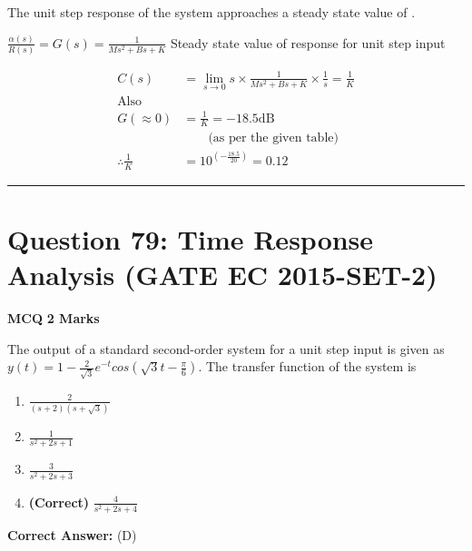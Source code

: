 \documentclass[11pt,a4paper]{article}
\begin{document}
The unit step response of the system approaches a steady state value of \underline{\hspace{1.5cm}} .


\begin{tcolorbox}[solbox, title=Detailed Solution -- Question 78]
$\frac{\alpha(s)}{R(s)}=G(s)=\frac{1}{M s^{2}+B s+K}$
 Steady state value of response for unit step input

\[
\begin{aligned} C(s)&=\lim _{s \rightarrow 0} s \times \frac{1}{M s^{2}+B s+K} \times \frac{1}{s}=\frac{1}{K} \\ \text{Also}&\\ G(\approx 0)&=\frac{1}{K}=-18.5 \mathrm{dB} \\ &\qquad\text{(as per the given table)}\\ \therefore \frac{1}{K}&=10^{\left(-\frac{18.5}{20}\right)}=0.12 \end{aligned}
\]
\end{tcolorbox}

\vspace{1.5em}
\hrule
\vspace{1.5em}

\section*{Question 79: Time Response Analysis (GATE EC 2015-SET-2)}
\noindent \textbf{\color{primary}MCQ} \hfill \textbf{\color{secondary}2 Marks}


\noindent The output of a standard second-order system for a unit step input is given as $y(t)=1-\frac{2}{\sqrt{3}}e^{-t}cos(\sqrt{3}t-\frac{\pi }{6})$. The transfer function of the system is


\begin{enumerate}[label=(\Alph*)]
    \item $\frac{2}{(s+2)(s+\sqrt{3})}$
    \item $\frac{1}{s^2+2s+1}$
    \item $\frac{3}{s^2+2s+3}$
    \item \textbf{(Correct)} $\frac{4}{s^2+2s+4}$
\end{enumerate}

\noindent \textbf{Correct Answer:} (D)
\end{document}
